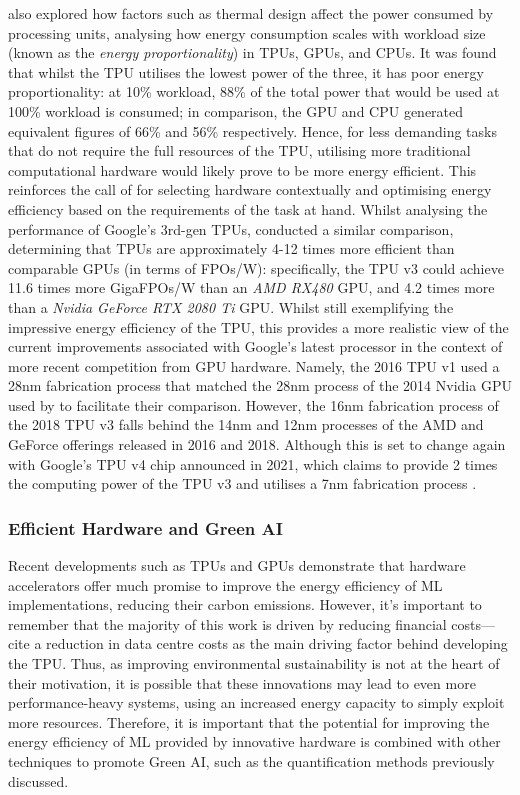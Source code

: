 \documentclass[a4paper, 12pt]{article}
\begin{document}
     also explored how factors such as thermal design affect the power consumed by processing units, analysing how energy consumption scales with workload size (known as the \emph{energy proportionality}) in TPUs, GPUs, and CPUs. It was found that whilst the TPU utilises the lowest power of the three, it has poor energy proportionality: at 10\% workload, 88\% of the total power that would be used at 100\% workload is consumed; in comparison, the GPU and CPU generated equivalent figures of 66\% and 56\% respectively. Hence, for less demanding tasks that do not require the full resources of the TPU, utilising more traditional computational hardware would likely prove to be more energy efficient. This reinforces the call of  for selecting hardware contextually and optimising energy efficiency based on the requirements of the task at hand. Whilst analysing the performance of Google's 3rd-gen TPUs,  conducted a similar comparison, determining that TPUs are approximately 4-12 times more efficient than comparable GPUs (in terms of FPOs/W): specifically, the TPU v3 could achieve 11.6 times more GigaFPOs/W than an \emph{AMD RX480} GPU, and 4.2 times more than a \emph{Nvidia GeForce RTX 2080 Ti} GPU. Whilst still exemplifying the impressive energy efficiency of the TPU, this provides a more realistic view of the current improvements associated with Google's latest processor in the context of more recent competition from GPU hardware. Namely, the 2016 TPU v1 used a 28nm fabrication process that matched the 28nm process of the 2014 Nvidia GPU used by  to facilitate their comparison. However, the 16nm fabrication process of the 2018 TPU v3 falls behind the 14nm and 12nm processes of the AMD and GeForce offerings released in 2016 and 2018. Although this is set to change again with Google's TPU v4 chip announced in 2021, which claims to provide 2 times the computing power of the TPU v3 and utilises a 7nm fabrication process \cite{wang-selvan-2021}.

    \subsubsection{Efficient Hardware and Green AI}

    Recent developments such as TPUs and GPUs demonstrate that hardware accelerators offer much promise to improve the energy efficiency of ML implementations, reducing their carbon emissions. However, it's important to remember that the majority of this work is driven by reducing financial costs--- cite a reduction in data centre costs as the main driving factor behind developing the TPU. Thus, as improving environmental sustainability is not at the heart of their motivation, it is possible that these innovations may lead to even more performance-heavy systems, using an increased energy capacity to simply exploit more resources. Therefore, it is important that the potential for improving the energy efficiency of ML provided by innovative hardware is combined with other techniques to promote Green AI, such as the quantification methods previously discussed.
\end{document}
